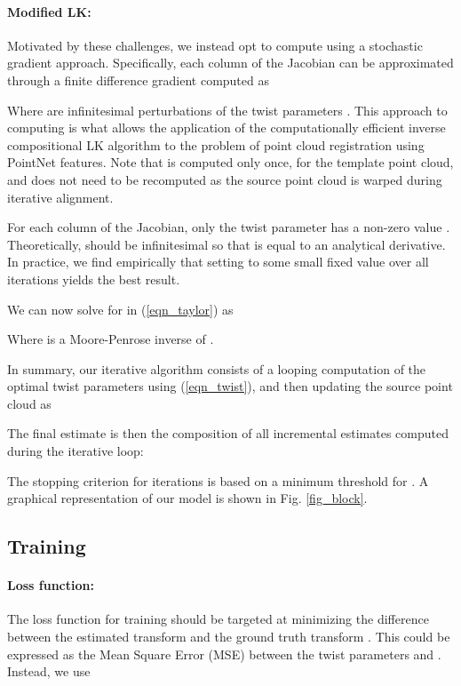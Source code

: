 \documentclass[10pt,twocolumn,letterpaper]{article}
\begin{document}
\paragraph{Modified LK:}
Motivated by these challenges, we instead opt to compute  using a stochastic gradient approach. Specifically, each column  of the Jacobian can be approximated through a finite difference gradient computed as



Where  are infinitesimal perturbations of the twist parameters . This approach to computing  is what allows the application of the computationally efficient inverse compositional LK algorithm to the problem of point cloud registration using PointNet features. Note that  is computed only once, for the template point cloud, and does not need to be recomputed as the source point cloud is warped during iterative alignment. 


For each column  of the Jacobian, only the  twist parameter has a non-zero value . Theoretically,  should be infinitesimal so that  is equal to an analytical derivative. In practice, we find empirically that setting  to some small fixed value over all iterations yields the best result.

We can now solve for  in (\ref{eqn_taylor}) as



Where  is a Moore-Penrose inverse of . 

In summary, our iterative algorithm consists of a looping computation of the optimal twist parameters using (\ref{eqn_twist}), and then updating the source point cloud  as



The final estimate  is then the composition of all incremental estimates computed during the iterative loop:



The stopping criterion for iterations is based on a minimum threshold for . A graphical representation of our model is shown in Fig. \ref{fig_block}.

\subsection{Training} \label{method_training}

\paragraph{Loss function:} The loss function for training should be targeted at minimizing the difference between the estimated transform  and the ground truth transform . This could be expressed as the Mean Square Error (MSE) between the twist parameters  and . Instead, we use
\end{document}
